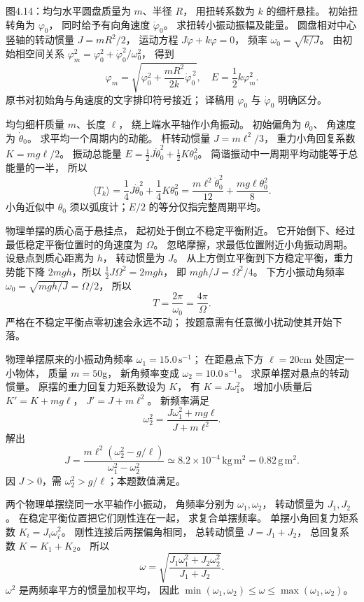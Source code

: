 图4.14：均匀水平圆盘质量为 $m$、半径 $R$，
用扭转系数为 $k$ 的细杆悬挂。
初始扭转角为 $\varphi_0$，
同时给予有向角速度 $\dot\varphi_0$。
求扭转小振动振幅及能量。
\exsolution
圆盘相对中心竖轴的转动惯量
$J=mR^2/2$，
运动方程
$J\ddot\varphi+k\varphi=0$，
频率
$\omega_0=\sqrt{k/J}$。
由初始相空间关系
$\varphi_m^2=\varphi_0^2+
\dot\varphi_0^2/\omega_0^2$，
得到
\[
\boxed{\varphi_m=
\sqrt{\varphi_0^2+\frac{mR^2}{2k}
\dot\varphi_0^{\,2}}},
\quad
\boxed{E=\frac12k\varphi_m^2}.
\]
\excheck 原书对初始角与角速度的文字排印符号接近；
译稿用 $\varphi_0$ 与 $\dot\varphi_0$ 明确区分。

均匀细杆质量 $m$、长度 $\ell$，
绕上端水平轴作小角振动。
初始偏角为 $\theta_0$、
角速度为 $\dot\theta_0$。
求平均一个周期内的动能。
\exsolution
杆转动惯量
$J=m\ell^2/3$，
重力小角回复系数
$K=mg\ell/2$。
振动总能量
$E=\tfrac12J\dot\theta_0^2+
\tfrac12K\theta_0^2$。
简谐振动中一周期平均动能等于总能量的一半，
所以
\[
\boxed{\langle T_k\rangle=
\frac14J\dot\theta_0^2+
\frac14K\theta_0^2
=\frac{m\ell^2\dot\theta_0^2}{12}
+\frac{mg\ell\theta_0^2}{8}}.
\]
\excheck 小角近似中 $\theta_0$ 须以弧度计；$E/2$ 的等分仅指完整周期平均。

物理单摆的质心高于悬挂点，
起初处于倒立不稳定平衡附近。
它开始倒下、经过最低稳定平衡位置时的角速度为 $\Omega$。
忽略摩擦，求最低位置附近小角振动周期。
\exsolution
设悬点到质心距离为 $h$，
转动惯量为 $J$。
从上方倒立平衡到下方稳定平衡，重力势能下降
$2mgh$，所以
$\tfrac12J\Omega^2=2mgh$，
即
$mg h/J=\Omega^2/4$。
下方小振动角频率
$\omega_0=\sqrt{mgh/J}=\Omega/2$，
所以
\[
\boxed{T=\frac{2\pi}{\omega_0}
=\frac{4\pi}{\Omega}}.
\]
\excheck 严格在不稳定平衡点零初速会永远不动；
按题意需有任意微小扰动使其开始下落。

物理单摆原来的小振动角频率
$\omega_1=15.0\,\mathrm{s^{-1}}$；
在距悬点下方 $\ell=20$cm 处固定一小物体，
质量 $m=50$g，
新角频率变成
$\omega_2=10.0\,\mathrm{s^{-1}}$。
求原单摆对悬点的转动惯量。
\exsolution
原摆的重力回复力矩系数设为 $K$，
有
$K=J\omega_1^2$。
增加小质量后
$K'=K+mg\ell$，
$J'=J+m\ell^2$。
新频率满足
\[
\omega_2^2=
\frac{J\omega_1^2+mg\ell}{J+m\ell^2}.
\]
解出
\[
\boxed{J=
\frac{m\ell^2(\omega_2^2-g/\ell)}
{\omega_1^2-\omega_2^2}}
\simeq8.2\times10^{-4}\,\mathrm{kg\,m^2}
=0.82\,\mathrm{g\,m^2}.
\]
\excheck 因 $J>0$，需
$\omega_2^2>g/\ell$；本题数值满足。

两个物理单摆绕同一水平轴作小振动，
角频率分别为 $\omega_1,\omega_2$，
转动惯量为 $J_1,J_2$。
在稳定平衡位置把它们刚性连在一起，
求复合单摆频率。
\exsolution
单摆小角回复力矩系数
$K_i=J_i\omega_i^2$。
刚性连接后两摆偏角相同，
总转动惯量
$J=J_1+J_2$，
总回复系数
$K=K_1+K_2$。
所以
\[
\boxed{\omega=
\sqrt{\frac{J_1\omega_1^2+J_2\omega_2^2}
{J_1+J_2}}}.
\]
\excheck $\omega^2$ 是两频率平方的惯量加权平均，
因此 $\min(\omega_1,\omega_2)\le\omega\le\max(\omega_1,\omega_2)$。
